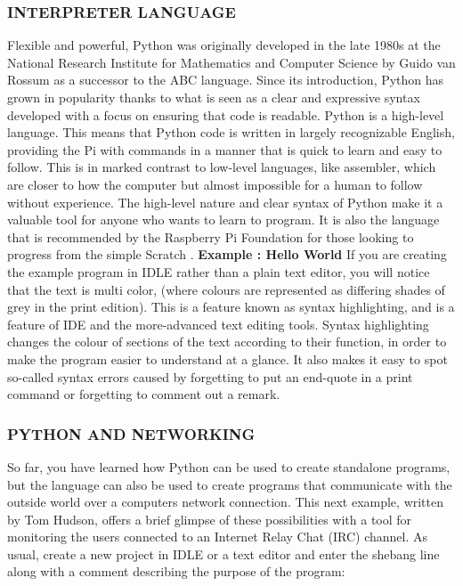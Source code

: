 \subsubsection{INTERPRETER LANGUAGE}
Flexible and powerful, Python was originally developed in the late 1980s at the National Research Institute for Mathematics and Computer Science by Guido van Rossum as a successor to the ABC language. Since its introduction, Python has grown in popularity thanks to what is seen as a clear and expressive syntax developed with a focus on ensuring that code is readable. Python is a high-level language. This means that Python code is written in largely recognizable English, providing the Pi with commands in a manner that is quick to learn and easy to follow. This is in marked contrast to low-level languages, like assembler, which are closer to how the computer  but almost impossible for a human to follow without experience. The high-level nature and clear syntax of Python make it a valuable tool for anyone who wants to learn to program. It is also the language that is recommended by the Raspberry Pi Foundation for those looking to progress from the simple Scratch .
\textbf{Example : Hello World}
If you are creating the example program in IDLE rather than a plain text editor, you will notice that the text is multi color, (where colours are represented as differing shades of grey in the print edition). This is a feature known as syntax highlighting, and is a feature of IDE and the more-advanced text editing tools. Syntax highlighting changes the colour of sections of the text according to their function, in order to make the program easier to understand at a glance. It also makes it easy to spot so-called syntax errors caused by forgetting to put an end-quote in a print command or forgetting to comment out a remark.

\subsubsection{PYTHON AND NETWORKING}
So far, you have learned how Python can be used to create standalone programs, but the language can also be used to create programs that communicate with the outside world over a computers network connection. This next example, written by Tom Hudson, offers a brief glimpse of these possibilities with a tool for monitoring the users connected to an Internet Relay Chat (IRC) channel. As usual, create a new project in IDLE or a text editor and enter the shebang line along with a comment describing the purpose of the program:

